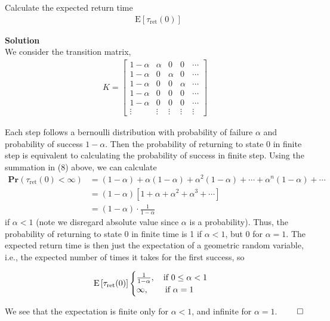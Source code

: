 \documentclass[5pt]{article}
\newcommand{\E}{\mathrm{E}}
\newcommand{\pr}{\mathbf{Pr}}
\begin{document}
Calculate the expected return time
\begin{align}
	& \E \left[ \tau_{\mathrm{ret}}(0) \right]
\end{align}


\textbf{Solution} \\
We consider the transition matrix,
\begin{align*}
K = 
	\begin{bmatrix}
		1 - \alpha  & \alpha & 0 & 0      & \cdots \\		
		1 - \alpha  & 0 & \alpha & 0      & \cdots \\	
		1 - \alpha  & 0 & 0      & \alpha & \cdots \\	
		1 - \alpha  & 0 & 0      & 0      & \cdots \\	
		1 - \alpha  & 0 & 0      & 0      & \cdots \\
		\vdots  & \vdots & \vdots  & \vdots  & \vdots 
	\end{bmatrix}
\end{align*}

Each step follows a bernoulli distribution with probability of failure $\alpha$ and probability of success $1 - \alpha$. Then the probability of returning to state 0 in finite step is equivalent to calculating the probability of success in finite step. Using the summation in (8) above, we can calculate 
\begin{align*}
	\pr \left( \tau_{\mathrm{ret}}(0) < \infty \right) &= (1 - \alpha) + \alpha(1 - \alpha) + \alpha^2(1 - \alpha) + \cdots + \alpha^n(1 - \alpha) + \cdots \\
	&= (1 - \alpha) \left[ 1 + \alpha + \alpha^2 + \alpha^3 + \cdots \right] \\
	&= (1 - \alpha) \cdot \frac{1}{1-\alpha}
\end{align*} 
if $\alpha < 1$ (note we disregard absolute value since $\alpha$ is a probability). Thus, the probability of returning to state 0 in finite time is 1 if $\alpha < 1$, but 0 for $\alpha = 1$. The expected return time is then just the expectation of a geometric random variable, i.e., the expected number of times it takes for the first success, so

\[ \E \left[ \tau_{\mathrm{ret}}(0) \right]
\begin{cases}   
	\frac{1}{1 - \alpha}, \quad \textnormal{if } 0 \leq \alpha < 1 \\
	\infty, \qquad \textnormal{if } \alpha = 1
\end{cases}
\]

We see that the expectation is finite only for $\alpha < 1$, and infinite for $\alpha = 1$. \hfill $\qed$
\end{document}
